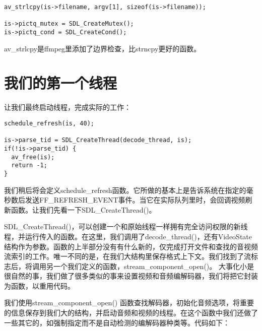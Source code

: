 \begin{lstlisting}
av_strlcpy(is->filename, argv[1], sizeof(is->filename));

is->pictq_mutex = SDL_CreateMutex();
is->pictq_cond = SDL_CreateCond();
\end{lstlisting}

av_strlcpy是ffmpeg里添加了边界检查，比strncpy更好的函数。

\section{我们的第一个线程 }

让我们最终启动线程，完成实际的工作：
\begin{lstlisting}
schedule_refresh(is, 40);

is->parse_tid = SDL_CreateThread(decode_thread, is);
if(!is->parse_tid) {
  av_free(is);
  return -1;
}
\end{lstlisting}

我们稍后将会定义schedule_refresh函数。它所做的基本上是告诉系统在指定的毫秒数后发送FF_REFRESH_EVENT事件。当它在实际队列里时，会回调视频刷新函数。让我们先看一下SDL_CreateThread()。

SDL_CreateThread()，可以创建一个和原始线程一样拥有完全访问权限的新线程，并运行传入的函数。在这里，我们调用了decode_thread()，还有VideoState结构作为参数。函数的上半部分没有有什么新的，仅完成打开文件和查找的音视频流索引的工作。唯一不同的是，在我们大结构里保存格式上下文。我们找到了流标志后，将调用另一个我们定义的函数，stream_component_open()。 大事化小是很自然的事，我们做了很多类似的事来设置视频和音频编解码器，我们将把它封装为函数，以重用代码。

我们使用stream_component_open() 函数查找解码器，初始化音频选项，将重要的信息保存到我们大的结构，并启动音频和视频的线程。在这个函数中我们还做了一些其它的，如强制指定而不是自动检测的编解码器种类等。代码如下：

